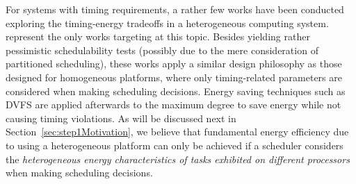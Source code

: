 For systems with timing requirements, a rather few works have been conducted exploring the timing-energy tradeoffs in a heterogeneous computing system. \cite{liuenergy, colin2014energy} represent the only works targeting at this topic. Besides yielding rather pessimistic schedulability tests (possibly due to the mere consideration of partitioned scheduling), these works apply a similar design philosophy as those designed for homogeneous platforms, where only timing-related parameters are considered when making scheduling decisions. Energy saving techniques such as DVFS are applied afterwards to the maximum degree to save energy while not causing timing violations. As will be discussed next in Section~\ref{sec:step1Motivation}, we believe that fundamental energy efficiency due to using a heterogeneous platform can only be achieved if  a scheduler considers the \textit{heterogeneous energy characteristics of tasks exhibited on different processors} when making scheduling decisions.


